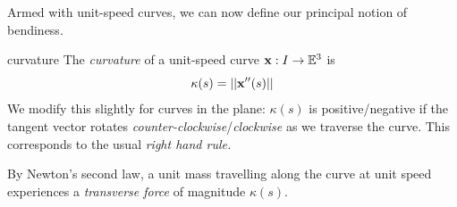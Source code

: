 \begin{examples}{}{}
\begin{enumerate}
	
\end{enumerate}
\end{examples}


\medskip


Armed with unit-speed curves, we can now define our principal notion of bendiness.

\begin{defn}{}{curvature}
The \emph{curvature} of a unit-speed curve ${\mathbf{x}}:I\to\mathbb{E}^3$ is 
\[\kappa(s)=\left| \left| {\mathbf{x}}''(s)\right|\right|\]
We modify this slightly for curves in the plane: $\kappa(s)$ is positive/negative if the tangent vector rotates \emph{counter-clockwise}/\emph{clockwise} as we traverse the curve. This corresponds to the usual \emph{right hand rule.}
\end{defn}

By Newton's second law, a unit mass travelling along the curve at unit speed experiences a \emph{transverse force} of magnitude $\kappa(s)$.

